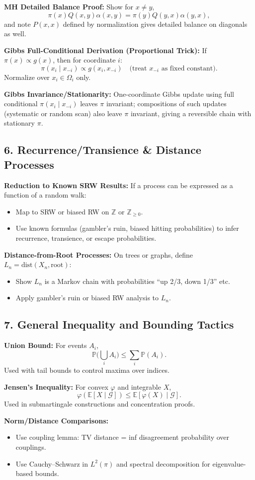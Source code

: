 \documentclass[answers,12pt,addpoints]{exam}
\begin{document}
\textbf{MH Detailed Balance Proof:}
Show for $x\neq y$,
\[
\pi(x)Q(x,y)\alpha(x,y)=\pi(y)Q(y,x)\alpha(y,x),
\]
and note $P(x,x)$ defined by normalization gives detailed balance on diagonals as well.

\textbf{Gibbs Full-Conditional Derivation (Proportional Trick):}
If $\pi(x)\propto g(x)$, then for coordinate $i$:
\[
\pi(x_i\mid x_{-i})\propto g(x_i,x_{-i}) \quad \text{(treat $x_{-i}$ as fixed constant)}.
\]
Normalize over $x_i\in\Omega_i$ only.

\textbf{Gibbs Invariance/Stationarity:}
One-coordinate Gibbs update using full conditional $\pi(x_i\mid x_{-i})$ leaves $\pi$ invariant; compositions of such updates (systematic or random scan) also leave $\pi$ invariant, giving a reversible chain with stationary $\pi$.

\subsection*{6. Recurrence/Transience \& Distance Processes}

\textbf{Reduction to Known SRW Results:}
If a process can be expressed as a function of a random walk:
\begin{itemize}
\item Map to SRW or biased RW on $\mathbb{Z}$ or $\mathbb{Z}_{\ge0}$.
\item Use known formulas (gambler’s ruin, biased hitting probabilities) to infer recurrence, transience, or escape probabilities.
\end{itemize}

\textbf{Distance-from-Root Processes:}
On trees or graphs, define $L_n=\mathrm{dist}(X_n,\text{root})$:
\begin{itemize}
\item Show $L_n$ is a Markov chain with probabilities “up 2/3, down 1/3” etc.
\item Apply gambler’s ruin or biased RW analysis to $L_n$.
\end{itemize}

\subsection*{7. General Inequality and Bounding Tactics}

\textbf{Union Bound:}
For events $A_i$,
\[
\mathbb{P}\Big(\bigcup_i A_i\Big)\le \sum_i \mathbb{P}(A_i).
\]
Used with tail bounds to control maxima over indices.

\textbf{Jensen's Inequality:}
For convex $\varphi$ and integrable $X$,
\[
\varphi(\mathbb{E}[X\mid\mathcal{G}])\le \mathbb{E}[\varphi(X)\mid\mathcal{G}].
\]
Used in submartingale constructions and concentration proofs.

\textbf{Norm/Distance Comparisons:}
\begin{itemize}
\item Use coupling lemma: TV distance = inf disagreement probability over couplings.
\item Use Cauchy–Schwarz in $L^2(\pi)$ and spectral decomposition for eigenvalue-based bounds.
\end{itemize}
\end{document}
